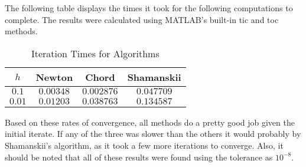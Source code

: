 \documentclass[paper=a4, fontsize=11pt]{scrartcl} %
\numberwithin{equation}{section} %
\numberwithin{figure}{section} %
\numberwithin{table}{section} %
\begin{document}
The following table displays the times it took for the following computations to complete.  The results were calculated using MATLAB's built-in tic and toc methods.  

\begin{table}[ht]
\begin{center}
\caption {Iteration Times for Algorithms}
\begin{tabular} {| c | c | c | c |}
\hline
$h$ & Newton & Chord & Shamanskii \\
\hline
$0.1$  & $0.00348$ & $0.002876$ & $0.047709$ \\
$0.01$ & $0.01203$ & $0.038763$ & $0.134587$ \\
\hline
\end{tabular}
\end{center}
\end{table}

Based on these rates of convergence, all methods do a pretty good job given the initial iterate.  If any of the three was slower than the others it would probably by Shamanskii's algorithm, as it took a few more iterations to converge.  Also, it should be noted that all of these results were found using the tolerance as $10^{-8}$.  







\end{document}

